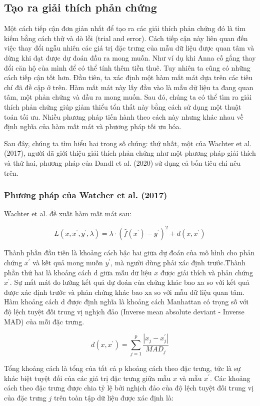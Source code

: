 \subsection{Tạo ra giải thích phản chứng}
Một cách tiếp cận đơn giản nhất để tạo ra các giải thích phản chứng đó là tìm kiếm bằng cách thử và dò lỗi (trial and error). Cách tiếp cận này liên quan đến việc thay đổi ngẫu nhiên các giá trị đặc trưng của mẫu dữ liệu được quan tâm và dừng khi đạt được dự đoán đầu ra mong muốn. Như ví dụ khi Anna cố gắng thay đổi căn hộ của mình để có thể tính thêm tiền thuê. Tuy nhiên ta cũng có những cách tiếp cận tốt hơn. Đầu tiên, ta xác định một hàm mất mát dựa trên các tiêu chí đã đề cập ở trên. Hàm mất mát này lấy đầu vào là mẫu dữ liệu ta đang quan tâm, một phản chứng và đầu ra mong muốn. Sau đó, chúng ta có thể tìm ra giải thích phản chứng giúp giảm thiểu tổn thất này bằng cách sử dụng một thuật toán tối ưu. Nhiều phương pháp tiến hành theo cách này nhưng khác nhau về định nghĩa của hàm mất mát và phương pháp tối ưu hóa.

Sau đây, chúng ta tìm hiểu hai trong số chúng: thứ nhất, một của Wachter et al. (2017), người đã giới thiệu giải thích phản chứng như một phương pháp giải thích và thứ hai, phương pháp của Dandl et al. (2020) sử dụng cả bốn tiêu chí nêu trên.

\subsubsection{Phương pháp của Watcher et al. (2017)}
Wachter et al. đề xuất hàm mất mát sau:

$$L(x,x^\prime,y^\prime,\lambda)=\lambda\cdot(\hat{f}(x^\prime)-y^\prime)^2+d(x,x^\prime)$$

Thành phần đầu tiên là khoảng cách bậc hai giữa dự đoán của mô hình cho phản chứng $x^\prime$ và kết quả mong muốn $y^\prime$, mà người dùng phải xác định trước.Thành phần thứ hai là khoảng cách d giữa mẫu dữ liệu $x$ được giải thích và phản chứng $x^\prime$. Sự mất mát đo lường kết quả dự đoán của chứng khác bao xa so với kết quả được xác định trước và phản chứng khác bao xa so với mẫu dữ liệu quan tâm. Hàm khoảng cách d được định nghĩa là khoảng cách Manhattan có trọng số với độ lệch tuyệt đối trung vị nghịch đảo (Inverse mean absolute deviant - Inverse MAD) của mỗi đặc trưng.

$$d(x,x^\prime)=\sum_{j=1}^p\frac{|x_j-x^\prime_j|}{MAD_j}$$

Tổng khoảng cách là tổng của tất cả p khoảng cách theo đặc trưng, tức là sự khác biệt tuyệt đối của các giá trị đặc trưng giữa mẫu $x$ và mẫu $x^\prime$. Các khoảng cách theo đặc trưng được chia tỷ lệ bởi nghịch đảo của độ lệch tuyệt đối trung vị của đặc trưng $j$ trên toàn tập dữ liệu được xác định là:

